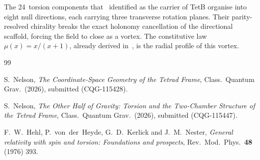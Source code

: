 \documentclass[twocolumn]{iopjournal}
\begin{document}
The 24~torsion components that~\cite{Nelson2026b}
identified as the carrier of TetB organise into
eight null directions, each carrying three transverse
rotation planes.  Their parity-resolved chirality
breaks the exact holonomy cancellation of the
directional scaffold, forcing the field to close as a
vortex.  The constitutive law $\mu(x) = x/(x{+}1)$,
already derived in~\cite{Nelson2026b}, is the radial
profile of this vortex.


\begin{thebibliography}{99}

S.~Nelson,
\textit{The Coordinate-Space Geometry of the Tetrad
Frame},
Class.\ Quantum Grav.\ (2026), submitted (CQG-115428).

S.~Nelson,
\textit{The Other Half of Gravity: Torsion and the
Two-Chamber Structure of the Tetrad Frame},
Class.\ Quantum Grav.\ (2026), submitted (CQG-115447).

F.~W.~Hehl, P.~von~der~Heyde, G.~D.~Kerlick and
J.~M.~Nester,
\textit{General relativity with spin and torsion:
Foundations and prospects},
Rev.\ Mod.\ Phys.\ \textbf{48} (1976) 393.

\end{thebibliography}
\end{document}

